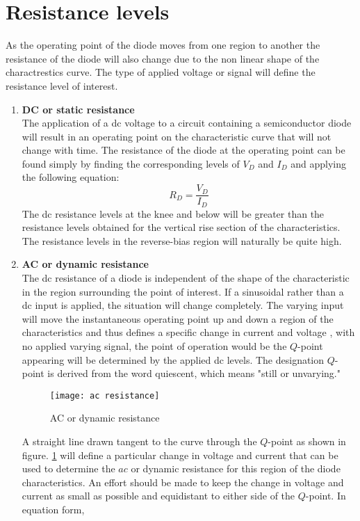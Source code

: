 \section{Resistance levels}
As the operating point of the diode moves from one region to another the resistance of the diode will also change due to the non linear shape of the charactrestics curve. The type of applied voltage or signal will define the resistance level of interest.
\begin{enumerate}
\item \textbf{DC or static resistance}\\
The application of a dc voltage to a circuit containing a semiconductor diode will result in an operating point on the characteristic curve that will not change with time. The resistance of the diode at the operating point can be found simply by finding the corresponding levels of $V_{D}$ and $I_{D}$ and applying the following equation:
\begin{equation}
R_{D}=\frac{V_{D}}{I_{D}}
\end{equation}
The dc resistance levels at the knee and below will be greater than the resistance levels obtained for the vertical rise section of the characteristics. The resistance levels in the reverse-bias region will naturally be quite high.
\item \textbf{AC or dynamic resistance}\\
The dc resistance of a diode is independent of the shape of the characteristic in the region surrounding the point of interest.
If a sinusoidal rather than a dc input is applied, the situation will change completely. The varying input will move the instantaneous operating point up and down a region of the characteristics and thus defines a specific change in current and voltage , with no applied varying signal, the point of operation would be the $Q$-point appearing will be determined by the applied dc levels. The designation $Q$-point is derived from the word quiescent, which means "still or unvarying."
\begin{figure}[H]
	\centering
	\texttt{[image: ac resistance]}
	\caption{AC or dynamic resistance}
	\label{ac resistance}
\end{figure}
A straight line drawn tangent to the curve through the $Q$-point as shown in figure. \ref{ac resistance} will define a particular change in voltage and current that can be used to determine the $a c$ or dynamic resistance for this region of the diode characteristics. An effort should be made to keep the change in voltage and current as small as possible and equidistant to either side of the $Q$-point. In equation form,

\end{enumerate}
